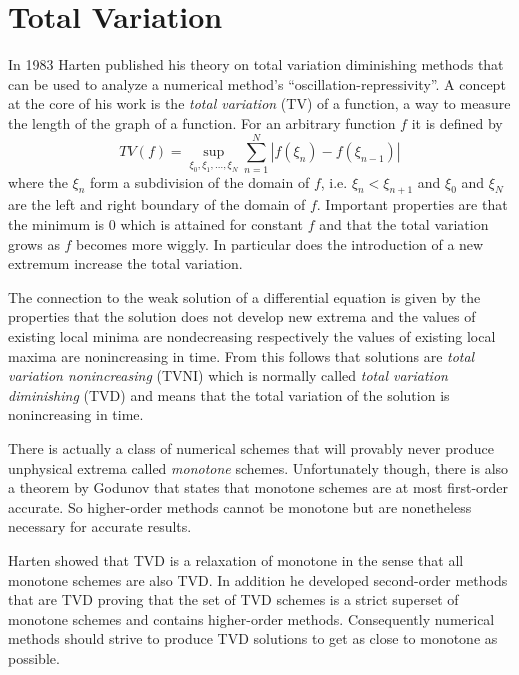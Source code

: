 \section{Total Variation}
\label{sec:total-variation}

In 1983 Harten published his theory on total variation diminishing methods \cite{Harten1983} that can be used to analyze a numerical method's ``oscillation-repressivity''.
A concept at the core of his work is the \emph{total variation} (TV) of a function, a way to measure the length of the graph of a function.
For an arbitrary function $f$ it is defined\cite[sec. 6.7]{LeVequeFVMforHP} by
\begin{equation*}
  TV(f) = \sup_{\xi_{0}, \xi_{1}, \dots, \xi_{N}} \sum_{n = 1}^{N} |f(\xi_{n}) - f(\xi_{n - 1})|
\end{equation*}
where the $\xi_{n}$ form a subdivision of the domain of $f$, i.e. $\xi_{n} < \xi_{n + 1}$ and $\xi_{0}$ and $\xi_{N}$ are the left and right boundary of the domain of $f$.
Important properties are that the minimum is $0$ which is attained for constant $f$ and that the total variation grows as $f$ becomes more wiggly.
In particular does the introduction of a new extremum increase the total variation.

The connection to the weak solution of a differential equation is given by the properties that the solution does not develop new extrema and the values of existing local minima are nondecreasing respectively the values of existing local maxima are nonincreasing in time.
From this follows that solutions are \emph{total variation nonincreasing} (TVNI) which is normally called \emph{total variation diminishing} (TVD) and means that the total variation of the solution is nonincreasing in time.

There is actually a class of numerical schemes that will provably never produce unphysical extrema called \emph{monotone} schemes.
Unfortunately though, there is also a theorem by Godunov\cite{Godunov1959} that states that monotone schemes are at most first-order accurate.
So higher-order methods cannot be monotone but are nonetheless necessary for accurate results.

Harten showed that TVD is a relaxation of monotone in the sense that all monotone schemes are also TVD.
In addition he developed second-order methods that are TVD proving that the set of TVD schemes is a strict superset of monotone schemes and contains higher-order methods.
Consequently numerical methods should strive to produce TVD solutions to get as close to monotone as possible.

